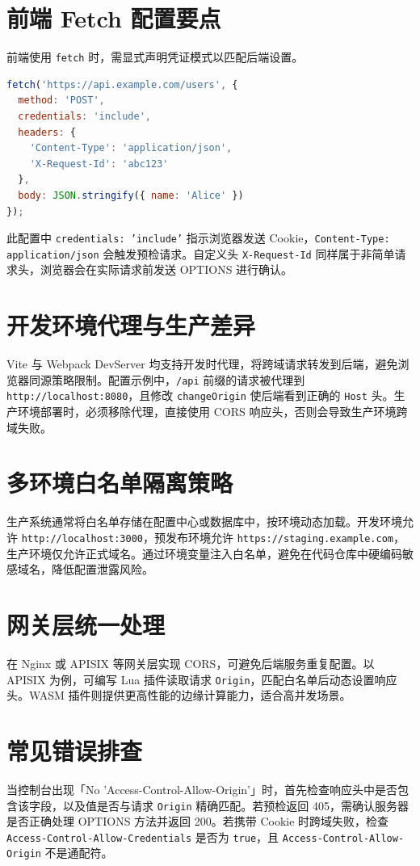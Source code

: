 \chapter{前端 Fetch 配置要点}
前端使用 \texttt{fetch} 时，需显式声明凭证模式以匹配后端设置。\par
\begin{lstlisting}[language=js]
fetch('https://api.example.com/users', {
  method: 'POST',
  credentials: 'include',
  headers: {
    'Content-Type': 'application/json',
    'X-Request-Id': 'abc123'
  },
  body: JSON.stringify({ name: 'Alice' })
});
\end{lstlisting}
此配置中 \texttt{credentials: 'include'} 指示浏览器发送 Cookie，\texttt{Content-Type: application/json} 会触发预检请求。自定义头 \texttt{X-Request-Id} 同样属于非简单请求头，浏览器会在实际请求前发送 OPTIONS 进行确认。\par
\chapter{开发环境代理与生产差异}
Vite 与 Webpack DevServer 均支持开发时代理，将跨域请求转发到后端，避免浏览器同源策略限制。配置示例中，\texttt{/api} 前缀的请求被代理到 \texttt{http://localhost:8080}，且修改 \texttt{changeOrigin} 使后端看到正确的 \texttt{Host} 头。生产环境部署时，必须移除代理，直接使用 CORS 响应头，否则会导致生产环境跨域失败。\par
\chapter{多环境白名单隔离策略}
生产系统通常将白名单存储在配置中心或数据库中，按环境动态加载。开发环境允许 \texttt{http://localhost:3000}，预发布环境允许 \texttt{https://staging.example.com}，生产环境仅允许正式域名。通过环境变量注入白名单，避免在代码仓库中硬编码敏感域名，降低配置泄露风险。\par
\chapter{网关层统一处理}
在 Nginx 或 APISIX 等网关层实现 CORS，可避免后端服务重复配置。以 APISIX 为例，可编写 Lua 插件读取请求 \texttt{Origin}，匹配白名单后动态设置响应头。WASM 插件则提供更高性能的边缘计算能力，适合高并发场景。\par
\chapter{常见错误排查}
当控制台出现「No 'Access-Control-Allow-Origin'」时，首先检查响应头中是否包含该字段，以及值是否与请求 \texttt{Origin} 精确匹配。若预检返回 405，需确认服务器是否正确处理 OPTIONS 方法并返回 200。若携带 Cookie 时跨域失败，检查 \texttt{Access-Control-Allow-Credentials} 是否为 \texttt{true}，且 \texttt{Access-Control-Allow-Origin} 不是通配符。\par
